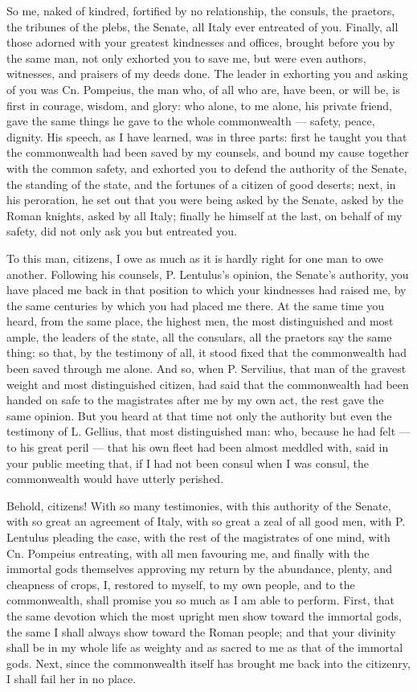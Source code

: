  So me, naked of kindred, fortified by no relationship, the consuls, the praetors, the tribunes of the plebs, the Senate, all Italy ever entreated of you. Finally, all those adorned with your greatest kindnesses and offices, brought before you by the same man, not only exhorted you to save me, but were even authors, witnesses, and praisers of my deeds done. The leader in exhorting you and asking of you was Cn. Pompeius, the man who, of all who are, have been, or will be, is first in courage, wisdom, and glory: who alone, to me alone, his private friend, gave the same things he gave to the whole commonwealth --- safety, peace, dignity. His speech, as I have learned, was in three parts: first he taught you that the commonwealth had been saved by my counsels, and bound my cause together with the common safety, and exhorted you to defend the authority of the Senate, the standing of the state, and the fortunes of a citizen of good deserts; next, in his peroration, he set out that you were being asked by the Senate, asked by the Roman knights, asked by all Italy; finally he himself at the last, on behalf of my safety, did not only ask you but entreated you.

 To this man, citizens, I owe as much as it is hardly right for one man to owe another. Following his counsels, P. Lentulus's opinion, the Senate's authority, you have placed me back in that position to which your kindnesses had raised me, by the same centuries by which you had placed me there. At the same time you heard, from the same place, the highest men, the most distinguished and most ample, the leaders of the state, all the consulars, all the praetors say the same thing: so that, by the testimony of all, it stood fixed that the commonwealth had been saved through me alone. And so, when P. Servilius, that man of the gravest weight and most distinguished citizen, had said that the commonwealth had been handed on safe to the magistrates after me by my own act, the rest gave the same opinion. But you heard at that time not only the authority but even the testimony of L. Gellius, that most distinguished man: who, because he had felt --- to his great peril --- that his own fleet had been almost meddled with, said in your public meeting that, if I had not been consul when I was consul, the commonwealth would have utterly perished.

 Behold, citizens! With so many testimonies, with this authority of the Senate, with so great an agreement of Italy, with so great a zeal of all good men, with P. Lentulus pleading the case, with the rest of the magistrates of one mind, with Cn. Pompeius entreating, with all men favouring me, and finally with the immortal gods themselves approving my return by the abundance, plenty, and cheapness of crops, I, restored to myself, to my own people, and to the commonwealth, shall promise you so much as I am able to perform. First, that the same devotion which the most upright men show toward the immortal gods, the same I shall always show toward the Roman people; and that your divinity shall be in my whole life as weighty and as sacred to me as that of the immortal gods. Next, since the commonwealth itself has brought me back into the citizenry, I shall fail her in no place.

